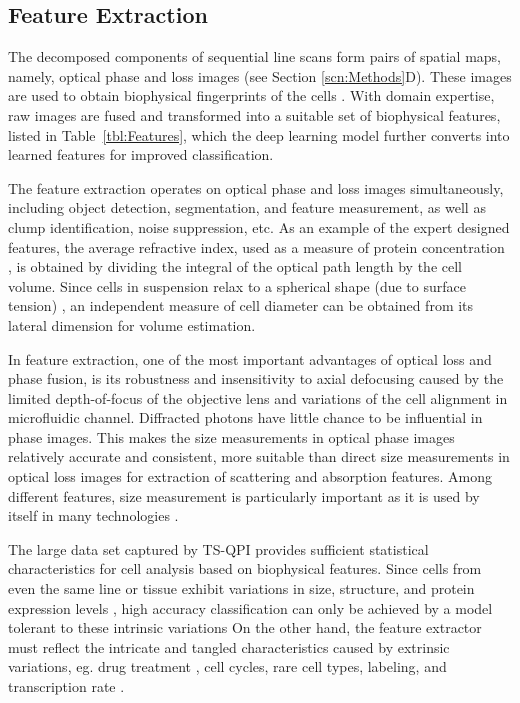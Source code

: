\documentclass[aps,pra,reprint,longbibliography,superscriptaddress]{revtex4-1}
\begin{document}
\subsection{Feature Extraction}

The decomposed components of sequential line scans form pairs of spatial maps, namely, optical phase and loss images (see Section \ref{scn:Methods}D). These images are used to obtain biophysical fingerprints of the cells \cite{mahjoubfar2013optically, driscoll2012automated}. With domain expertise, raw images are fused and transformed into a suitable set of biophysical features, listed in Table~\ref{tbl:Features}, which the deep learning model further converts into learned features for improved classification. 

The feature extraction operates on optical phase and loss images simultaneously, including object detection, segmentation, and feature measurement, as well as clump identification, noise suppression, etc. As an example of the expert designed features, the average refractive index, used as a measure of protein concentration \cite{barer1953refractometry}, is obtained by dividing the integral of the optical path length by the cell volume. Since cells in suspension relax to a spherical shape (due to surface tension) \cite{revel1974adhesion,whur1977substrate}, an independent measure of cell diameter can be obtained from its lateral dimension for volume estimation. 

In feature extraction, one of the most important advantages of optical loss and phase fusion, is its robustness and insensitivity to axial defocusing \cite{spadinger1990effect} caused by the limited depth-of-focus of the objective lens and variations of the cell alignment in microfluidic channel. Diffracted photons have little chance to be influential in phase images. This makes the size measurements in optical phase images relatively accurate and consistent, more suitable than direct size measurements in optical loss images for extraction of scattering and absorption features. Among different features, size measurement is particularly important as it is used by itself in many technologies \cite{adams2008highly, nagrath2007isolation, vona2000isolation, gossett2010label}.  

The large data set captured by TS-QPI provides sufficient statistical characteristics for cell analysis based on biophysical features. Since cells from even the same line or tissue exhibit variations in size, structure, and protein expression levels \cite{kaern2005stochasticity, maheshri2007living, zangle2014live}, high accuracy classification can only be achieved by a model tolerant to these intrinsic variations 
On the other hand, the feature extractor must reflect the intricate and tangled characteristics caused by extrinsic variations, eg. drug treatment \cite{spencer2009non}, cell cycles, rare cell types, labeling, and transcription rate \cite{johnston2012mitochondrial}. 
\end{document}
